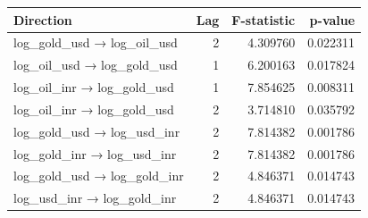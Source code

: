 \begin{tabular}{lrrr}
\toprule
Direction & Lag & F-statistic & p-value \\
\midrule
log_gold_usd → log_oil_usd & 2 & 4.309760 & 0.022311 \\
log_oil_usd → log_gold_usd & 1 & 6.200163 & 0.017824 \\
log_oil_inr → log_gold_usd & 1 & 7.854625 & 0.008311 \\
log_oil_inr → log_gold_usd & 2 & 3.714810 & 0.035792 \\
log_gold_usd → log_usd_inr & 2 & 7.814382 & 0.001786 \\
log_gold_inr → log_usd_inr & 2 & 7.814382 & 0.001786 \\
log_gold_usd → log_gold_inr & 2 & 4.846371 & 0.014743 \\
log_usd_inr → log_gold_inr & 2 & 4.846371 & 0.014743 \\
\bottomrule
\end{tabular}

